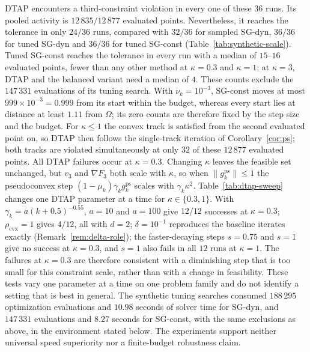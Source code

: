 \documentclass[]{interact}
\theoremstyle{plain}
\theoremstyle{definition}
\theoremstyle{remark}
\newcommand{\cvx}{\mathrm{cvx}}
\newcommand{\ps}{\mathrm{ps}}
\begin{document}
DTAP encounters a third-constraint violation in every one of these $36$
runs. Its pooled activity is $12\,835/12\,877$ evaluated points.
Nevertheless, it reaches the tolerance in only $24/36$ runs, compared
with $32/36$ for sampled SG-dyn, $36/36$ for tuned SG-dyn and $36/36$ for tuned
SG-const (Table~\ref{tab:synthetic-scale}).
Tuned SG-const reaches the tolerance in every run with a median of $15$--$16$
evaluated points, fewer than any other method at $\kappa=0.3$ and $\kappa=1$; at
$\kappa=3$, DTAP and the balanced variant need a median of $4$. These counts
exclude the $147\,331$ evaluations of its tuning search.
With $\nu_k=10^{-3}$, SG-const moves at most $999\times10^{-3}=0.999$ from its start
within the budget, whereas every start lies at distance at least $1.11$ from
$\Omega$; its zero counts are therefore fixed by the step size and the budget.
For $\kappa\le1$ the convex track is satisfied from the second evaluated point on,
so DTAP then follows the single-track iteration of Corollary~\ref{cor:ps}; both tracks are
violated simultaneously at only $32$ of these $12\,877$ evaluated points.
All DTAP failures occur at $\kappa=0.3$. Changing $\kappa$ leaves the feasible set
unchanged, but $v_3$ and $\nabla F_3$ both scale with $\kappa$, so when
$\|g^{\ps}_k\|\le1$ the pseudoconvex step $(1-\mu_k)\gamma_k g^{\ps}_k$ scales with
$\gamma_k\kappa^2$. Table~\ref{tab:dtap-sweep} changes one DTAP parameter at a time
for $\kappa\in\{0.3,1\}$. With $\gamma_k=a(k+0.5)^{-0.55}$, $a=10$ and $a=100$ give
$12/12$ successes at $\kappa=0.3$; $\rho_{\cvx}=1$ gives $4/12$, all with $d=2$;
$\delta=10^{-1}$ reproduces the baseline iterates exactly (Remark~\ref{rem:delta-role}); the
faster-decaying steps $s=0.75$ and $s=1$ give no success at $\kappa=0.3$, and
$s=1$ also fails in all $12$ runs at $\kappa=1$. The failures at $\kappa=0.3$ are
therefore consistent with a diminishing step that is too small for this
constraint scale, rather than with a change in feasibility. These tests vary
one parameter at a time on one problem family and do not identify a setting
that is best in general.
The synthetic tuning searches consumed $188\,295$ optimization evaluations and
$10.98$ seconds of solver time for SG-dyn, and $147\,331$ evaluations and $8.27$
seconds for SG-const, with the same exclusions as above, in the environment
stated below. The experiments support neither
universal speed superiority nor a finite-budget robustness claim.
\end{document}
